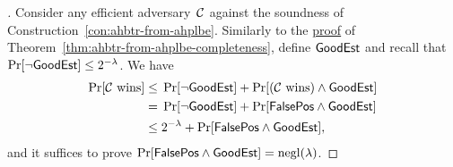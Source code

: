 \begin{proof}[]
Consider any efficient adversary~${\mathcal{C}}$ against the soundness of Construction~\ref{con:ahbtr-from-ahplbe}.
Similarly to the \hyperlink{pf:ahbtr-from-ahplbe-completeness}{proof} of Theorem~\ref{thm:ahbtr-from-ahplbe-completeness},
define $\GoodEst$ and recall that ${\Pr[\neg\GoodEst]\leq 2^{-\lambda}}$.
We have
\begin{align*}
\Pr[\scriptC\textup{ wins}]
\leq{}&
\Pr[\neg\GoodEst]
+
\Pr[(\scriptC\textup{ wins})\wedge\GoodEst]
\\{}={}&
\Pr[\neg\GoodEst]
+
\Pr[\FalsePos\wedge\GoodEst]
\\{}\leq{}&
2^{-\lambda}
+
\Pr[\FalsePos\wedge\GoodEst],
\end{align*}
and it suffices to prove ${\Pr[\FalsePos\wedge\GoodEst]=\negl(\lambda)}$.


\end{proof}
